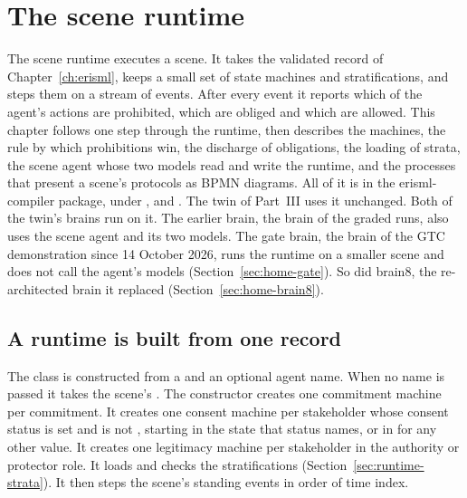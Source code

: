 \chapter{The scene runtime}\label{ch:runtime}

The scene runtime executes a scene. It takes the validated record of Chapter~\ref{ch:erisml}, keeps
a small set of state machines and stratifications, and steps them on a stream of events. After every
event it reports which of the agent's actions are prohibited, which are obliged and which are
allowed. This chapter follows one step through the runtime, then describes the machines, the rule
by which prohibitions win, the discharge of obligations, the loading of strata, the scene agent whose
two models read and write the runtime, and the processes that present a scene's protocols as BPMN
diagrams. All of it is in the erisml-compiler package, under ,  and
. The twin of Part~III uses it unchanged. Both of the twin's brains run on it. The
earlier brain, the brain of the graded runs, also uses the scene agent and its two models. The
gate brain, the brain of the GTC demonstration since 14 October 2026, runs the runtime on
a smaller scene and does not call the agent's models (Section~\ref{sec:home-gate}). So did brain8,
the re-architected brain it replaced (Section~\ref{sec:home-brain8}).

\section{A runtime is built from one record}\label{sec:runtime-build}

The class  is constructed from a  and an optional agent name.
When no name is passed it takes the scene's . The constructor creates one
commitment machine per commitment. It creates one consent machine per stakeholder whose consent
status is set and is not , starting in the state that status names, or in
 for any other value. It creates one legitimacy machine per stakeholder in the
authority or protector role. It loads and checks the stratifications
(Section~\ref{sec:runtime-strata}). It then steps the scene's standing events in order of time
index.

